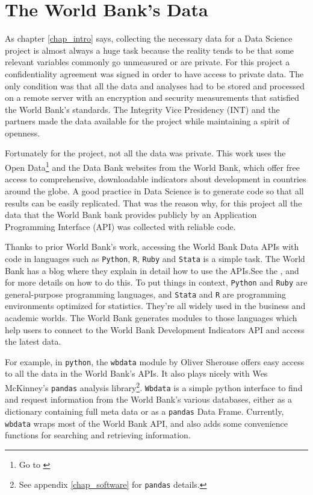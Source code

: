 \chapter{The World Bank's Data}\label{chap_data}

As chapter \ref{chap_intro} says, collecting the necessary data for a Data Science project is almost always a huge task because the reality tends to be that some relevant variables commonly go unmeasured or are private. For this project a confidentiality agreement was signed in order to have access to private data. The only condition was that all the data and analyses had to be stored and processed on a remote server with an encryption and security measurements that satisfied the World Bank's standards. The Integrity Vice Presidency (INT) and the partners made the data available for the project while maintaining a spirit of openness.

Fortunately for the project, not all the data was private. This work uses the Open Data\footnote{Go to \cite{wb_data}}  and the Data Bank websites from the World Bank, which offer free access to comprehensive, downloadable indicators about development in countries around the globe. A good practice in Data Science is to generate code so that all results can be easily replicated. That was the reason why, for this project all the data that the World Bank bank provides publicly by an Application Programming Interface (API) was collected with reliable code. 

Thanks to prior World Bank's work, accessing the World Bank Data APIs with code in languages such as \texttt{Python}, \texttt{R}, \texttt{Ruby} and \texttt{Stata} is a simple task. The World Bank has a blog where they explain in detail how to use the APIs.See the \cite{wb_api}, \cite{wb_python} and \cite{wb_r} for more details on how to do this. To put things in context, \texttt{Python} and \texttt{Ruby} are general-purpose programming languages, and \texttt{Stata} and \texttt{R} are programming environments optimized for statistics. They're all widely used in the business and academic worlds. The World Bank generates modules to those languages which help users to connect to the World Bank Development Indicators API and access the latest data.

For example, in \texttt{python}, the \texttt{wbdata} module by Oliver Sherouse offers easy access to all the data in the World Bank's APIs. It also plays nicely with Wes McKinney’s  \texttt{pandas} analysis library\footnote{See appendix \ref{chap_software} for \texttt{pandas} details.}. \texttt{Wbdata} is a simple python interface to find and request information from the World Bank's various databases, either as a dictionary containing full meta data or as a \texttt{pandas} Data Frame. Currently, \texttt{wbdata} wraps most of the World Bank API, and also adds some convenience functions for searching and retrieving information.

